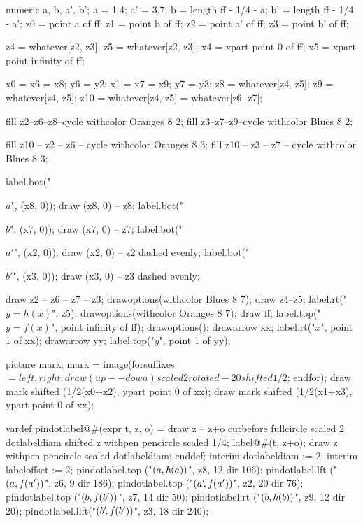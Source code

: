 \documentclass[oneside]{scrbook}
\begin{document}
  numeric a, b, a', b'; a = 1.4; a' = 3.7; b = length ff - 1/4 - a; b' = length ff - 1/4 - a';
  z0 = point a  of ff; z1 = point b  of ff; z2 = point a' of ff; z3 = point b' of ff;

  z4 = whatever[z2, z3]; z5 = whatever[z2, z3];
  x4 = xpart point 0 of ff; x5 = xpart point infinity of ff;

  x0 = x6 = x8; y6 = y2; x1 = x7 = x9; y7 = y3;
  z8 = whatever[z4, z5]; z9 = whatever[z4, z5];
  z10 = whatever[z4, z5] = whatever[z6, z7];
  

  fill z2--z6--z8--cycle withcolor Oranges 8 2;
  fill z3--z7--z9--cycle withcolor Blues 8 2;

  fill z10 -- z2 -- z6 -- cycle withcolor Oranges 8 3;
  fill z10 -- z3 -- z7 -- cycle withcolor Blues 8 3;

  label.bot("\strut $a$",  (x8, 0)); draw (x8, 0) -- z8; 
  label.bot("\strut $b$",  (x7, 0)); draw (x7, 0) -- z7; 
  label.bot("\strut $a'$", (x2, 0)); draw (x2, 0) -- z2 dashed evenly; 
  label.bot("\strut $b'$", (x3, 0)); draw (x3, 0) -- z3 dashed evenly; 

  draw z2 -- z6 -- z7 -- z3;
  drawoptions(withcolor Blues 8 7);
  draw z4--z5; label.rt("$y=h(x)$", z5);
  drawoptions(withcolor Oranges 8 7);
  draw ff; label.top("$y=f(x)$", point infinity of ff);
  drawoptions();
  drawarrow xx; label.rt("$x$", point 1 of xx);
  drawarrow yy; label.top("$y$", point 1 of yy);

  picture mark; mark = image(forsuffixes $=left, right:
      draw (up--down) scaled 2 rotated -20 shifted 1/2 $;
  endfor);
  draw mark shifted (1/2(x0+x2), ypart point 0 of xx);
  draw mark shifted (1/2(x1+x3), ypart point 0 of xx);

  vardef pindotlabel@#(expr t, z, o) = 
      draw z -- z+o cutbefore fullcircle scaled 2 dotlabeldiam shifted z
          withpen pencircle scaled 1/4;
      label@#(t, z+o); draw z withpen pencircle scaled dotlabeldiam;
  enddef; interim dotlabeldiam := 2; interim labeloffset := 2;
  pindotlabel.top ("$(a, h\kern-0.4pt(a))$",     z8, 12 dir 106);
  pindotlabel.lft ("$(a, f\kern-0.4pt(a'))$",    z6,  9 dir 186);
  pindotlabel.top ("$(a'\!, f\kern-0.4pt(a'))$", z2, 20 dir 76);
  pindotlabel.top ("$(b, f\kern-0.4pt(b'))$",    z7, 14 dir 50);
  pindotlabel.rt  ("$(b, h\kern-0.4pt(b))$",     z9, 12 dir 20);
  pindotlabel.llft("$(b'\!, f\kern-0.4pt(b'))$", z3, 18 dir 240);
\end{document}
